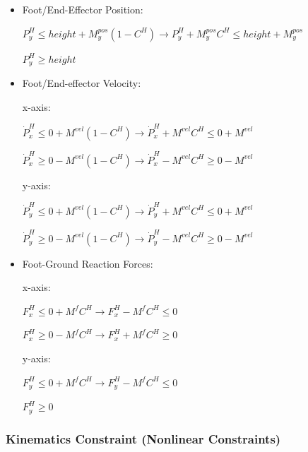 \documentclass[a4paper,10pt]{article}
\begin{document}
\begin{itemize}
	\item Foot/End-Effector Position:
	
	$P^H_y \leq height + M^{pos}_y(1-C^H) \rightarrow P^H_y +  M^{pos}_yC^H \leq height + M^{pos}_y$
	
	$P^H_y \geq height$
	
	\item Foot/End-effector Velocity:
	
	x-axis:
	
	$\dot{P}^H_x \leq 0 + M^{vel}(1-C^H) \rightarrow \dot{P}^H_x + M^{vel}C^H \leq 0 + M^{vel}$
	
	$\dot{P}^H_x \geq 0 - M^{vel}(1-C^H) \rightarrow \dot{P}^H_x - M^{vel}C^H \geq 0 - M^{vel}$
	
	y-axis:
	
	$\dot{P}^H_y \leq 0 + M^{vel}(1-C^H) \rightarrow \dot{P}^H_y + M^{vel}C^H \leq 0 + M^{vel}$
	
	$\dot{P}^H_y \geq 0 - M^{vel}(1-C^H) \rightarrow \dot{P}^H_y - M^{vel}C^H \geq 0 - M^{vel}$
	
	\item Foot-Ground Reaction Forces:
	
	x-axis:
	
	$F^H_x \leq 0 + M^fC^H \rightarrow F^H_x - M^fC^H \leq 0$
	
	$F^H_x \geq 0 - M^fC^H \rightarrow F^H_x + M^fC^H \geq 0$
	
	y-axis:
	
	$F^H_y \leq 0 + M^fC^H \rightarrow F^H_y - M^fC^H \leq 0$
	
	$F^H_y \geq 0$
	
\end{itemize}

\vspace{3mm}

\subsubsection{Kinematics Constraint (Nonlinear Constraints)}
\end{document}
